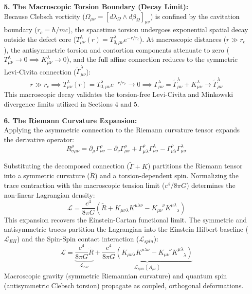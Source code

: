 \textbf{5. The Macroscopic Torsion Boundary (Decay Limit):} \\ 
Because Clebsch vorticity ($\Omega_{\mu\nu} = [d\lambda_\Omega \wedge d\beta_\Omega]_{\mu\nu}$) is confined by the cavitation boundary ($r_c = \hbar/mc$), the spacetime torsion undergoes exponential spatial decay outside the defect core ($T^\lambda_{\mu\nu}(r) = T^\lambda_{0,\mu\nu} e^{-r/r_c}$). At macroscopic distances ($r \gg r_c$), the antisymmetric torsion and contortion components attenuate to zero ($T^\lambda_{\mu\nu} \to 0 \implies K^\lambda_{\mu\nu} \to 0$), and the full affine connection reduces to the symmetric Levi-Civita connection ($\tilde{\Gamma}^\lambda_{\mu\nu}$):
\begin{equation}
    r \gg r_c \implies T^\lambda_{\mu\nu}(r) = T^\lambda_{0,\mu\nu} e^{-r/r_c} \to 0 \implies \Gamma^\lambda_{\mu\nu} = \tilde{\Gamma}^\lambda_{\mu\nu} + K^\lambda_{\mu\nu} \to \tilde{\Gamma}^\lambda_{\mu\nu} %
\end{equation}
This macroscopic decay validates the torsion-free Levi-Civita and Minkowski divergence limits utilized in Sections 4 and 5.

\vspace{0.2 cm}

\textbf{6. The Riemann Curvature Expansion:} \\ 
Applying the asymmetric connection to the Riemann curvature tensor expands the derivative operator:
\begin{equation}
    R^\rho_{\sigma\mu\nu} = \partial_\mu \Gamma^\rho_{\nu\sigma} - \partial_\nu \Gamma^\rho_{\mu\sigma} + \Gamma^\rho_{\mu\lambda} \Gamma^\lambda_{\nu\sigma} - \Gamma^\rho_{\nu\lambda} \Gamma^\lambda_{\mu\sigma}
\end{equation}

Substituting the decomposed connection ($\tilde{\Gamma} + K$) partitions the Riemann tensor into a symmetric curvature ($\tilde{R}$) and a torsion-dependent spin. Normalizing the trace contraction with the macroscopic tension limit ($c^4/8\pi G$) determines the non-linear Lagrangian density: 
\begin{equation}
    \mathcal{L} = \frac{c^4}{8\pi G} \left( \tilde{R} + K_{\mu\nu\lambda} K^{\mu\lambda\nu} - K_{\mu\nu}^{\phantom{\mu\nu}\nu} K^{\mu\lambda}_{\phantom{\mu\lambda}\lambda} \right)
\end{equation}
This expansion recovers the Einstein-Cartan functional limit. The symmetric and antisymmetric traces partition the Lagrangian into the Einstein-Hilbert baseline ($\mathcal{L}_{EH}$) and the Spin-Spin contact interaction ($\mathcal{L}_{spin}$): 
\begin{equation}
    \mathcal{L} = \underbrace{\frac{c^4}{8\pi G} \tilde{R}}_{\mathcal{L}_{EH}} + \underbrace{\frac{c^4}{8\pi G} \left( K_{\mu\nu\lambda} K^{\mu\lambda\nu} - K_{\mu\nu}^{\phantom{\mu\nu}\nu} K^{\mu\lambda}_{\phantom{\mu\lambda}\lambda} \right)}_{\mathcal{L}_{spin}(A_{\mu\nu})} 
\end{equation}
Macroscopic gravity (symmetric Riemannian curvature) and quantum spin (antisymmetric Clebsch torsion) propagate as coupled, orthogonal deformations.

